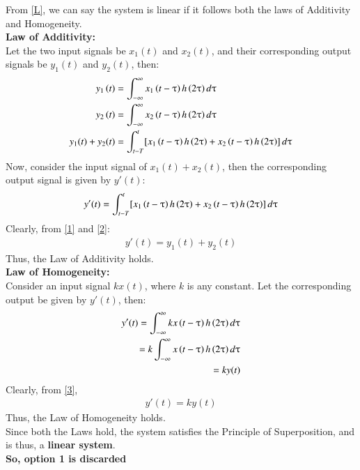 \documentclass[journal,12pt,twocolumn]{IEEEtran}
\begin{document}
From \eqref{L}, we can say the system is linear if it follows both the laws of Additivity and Homogeneity.\\
\textbf{Law of Additivity:}\\
Let the two input signals be $x_1(t)$ and $x_2(t)$, and their corresponding output signals be $y_1(t)$ and $y_2(t)$, then:
\begin{align}
    y_{1}\left(t\right)&=\int_{-\infty}^{\infty}x_{1}\left(t-\uptau\right)h\left(2\uptau\right)d\uptau\\
    y_{2}\left(t\right)&=\int_{-\infty}^{\infty}x_{2}\left(t-\uptau\right)h\left(2\uptau\right)d\uptau \\
    y_1(t) + y_2(t) &= \int_{t-T}^t[x_{1}\left(t-\uptau\right)h\left(2\uptau\right) + x_{2}\left(t-\uptau\right)h\left(2\uptau\right)]\,d\uptau
    \label{1}
\end{align}
Now, consider the input signal of $x_1(t) + x_2(t)$, then the corresponding output signal is given by $y'(t)$:
\begin{align}
    y'(t) = \int_{t-T}^t[x_{1}\left(t-\uptau\right)h\left(2\uptau\right) + x_{2}\left(t-\uptau\right)h\left(2\uptau\right)]\,d\uptau
    \label{2}
\end{align}
Clearly, from \eqref{1} and \eqref{2}:
\begin{align}
    y'(t) = y_1(t) + y_2(t)
\end{align}
Thus, the Law of Additivity holds.\\
\textbf{Law of Homogeneity: }\\
Consider an input signal $kx(t)$, where $k$ is any constant. Let the corresponding output be given by $y'(t)$, then:
\begin{align}
    y'(t) = \int_{-\infty}^{\infty}kx\left(t-\uptau\right)h\left(2\uptau\right)d\uptau\\
    = k\int_{-\infty}^{\infty}x\left(t-\uptau\right)h\left(2\uptau\right)d\uptau\\
     = ky(t)
     \label{3}
\end{align}
Clearly, from \eqref{3},
\begin{align}
    y'(t) = ky(t)
\end{align}
Thus, the Law of Homogeneity holds.\\
Since both the Laws hold, the system satisfies the Principle of Superposition, and is thus, a \textbf{linear system}.\\
\textbf{So, option 1 is discarded}\\\\\\
\end{document}
